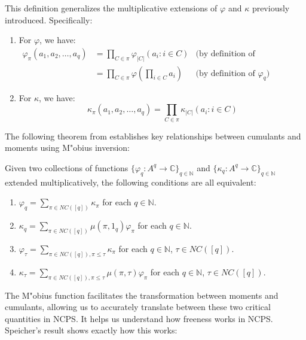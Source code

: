 \begin{remark}
This definition generalizes the multiplicative extensions of $\varphi$ and $\kappa$ previously introduced. Specifically:

\begin{enumerate}
    \item For $\varphi$, we have:
    \begin{align*}
    \varphi_{\pi} (a_1,a_2,\ldots,a_q) &= \prod_{C \in \pi} \varphi_{|C|}(a_i : i \in C) &\text{(by definition of multiplicative extension)}\\
    &=\prod_{C \in \pi} \varphi\left(\prod_{i \in C}a_i\right) &\text{(by definition of $\varphi_q$)}
    \end{align*}

    \item For $\kappa$, we have:
    \[
    \kappa_{\pi} (a_1,a_2,\ldots,a_q) = \prod_{C \in \pi} \kappa_{|C|}(a_i : i \in C)
    \]
\end{enumerate}
\end{remark}

The following theorem from \cite{JFApaper} establishes key relationships between cumulants and moments using M"{o}bius inversion:

\begin{theorem}\label{mob-thm}
Given two collections of functions $\{\varphi_q : A^q \to \mathbb{C}\}_{q \in \mathbb{N}}$ and $\{\kappa_q : A^q \to \mathbb{C}\}_{q \in \mathbb{N}}$ extended multiplicatively, the following conditions are all equivalent:
\begin{enumerate}
    \item $\varphi_q = \sum_{\pi \in NC([q])} \kappa_\pi$ for each $q \in \mathbb{N}$.
    \item $\kappa_q = \sum_{\pi \in NC([q])} \mu(\pi, 1_q) \varphi_\pi$ for each $q \in \mathbb{N}$.
    \item $\varphi_\tau = \sum_{\pi \in NC([q]), \pi \leq \tau} \kappa_\pi$ for each $q \in \mathbb{N}$, $\tau \in NC([q])$.
    \item $\kappa_\tau = \sum_{\pi \in NC([q]), \pi \leq \tau} \mu(\pi, \tau) \varphi_\pi$ for each $q \in \mathbb{N}$, $\tau \in NC([q])$.
\end{enumerate}
\end{theorem}

The M"{o}bius function facilitates the transformation between moments and cumulants, allowing us to accurately translate between these two critical quantities in NCPS. It helps us understand how freeness works in NCPS. Speicher's result shows exactly how this works:

